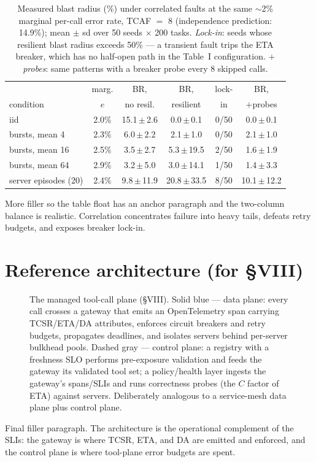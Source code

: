\documentclass[conference]{IEEEtran}
\begin{document}
\begin{table}[!t]
\caption{Measured blast radius (\%) under correlated faults at the same
$\sim$2\% marginal per-call error rate, TCAF $=$ 8 (independence prediction:
14.9\%); mean $\pm$ sd over 50 seeds $\times$ 200 tasks. \emph{Lock-in}: seeds
whose resilient blast radius exceeds 50\% --- a transient fault trips the ETA
breaker, which has no half-open path in the Table~I configuration.
\emph{$+$probes}: same patterns with a breaker probe every 8 skipped calls.}
\label{tab:correlated}
\centering
\scriptsize
\setlength{\tabcolsep}{2.8pt}
\begin{tabular}{lccccc}
\hline
 & marg. & BR, & BR, & lock- & BR,\\
condition & $e$ & no resil. & resilient & in & $+$probes\\
\hline
iid & 2.0\% & 15.1\,$\pm$\,2.6 & 0.0\,$\pm$\,0.1 & 0/50 & 0.0\,$\pm$\,0.1\\
bursts, mean 4 & 2.3\% & 6.0\,$\pm$\,2.2 & 2.1\,$\pm$\,1.0 & 0/50 & 2.1\,$\pm$\,1.0\\
bursts, mean 16 & 2.5\% & 3.5\,$\pm$\,2.7 & 5.3\,$\pm$\,19.5 & 2/50 & 1.6\,$\pm$\,1.9\\
bursts, mean 64 & 2.9\% & 3.2\,$\pm$\,5.0 & 3.0\,$\pm$\,14.1 & 1/50 & 1.4\,$\pm$\,3.3\\
server episodes (20) & 2.4\% & 9.8\,$\pm$\,11.9 & 20.8\,$\pm$\,33.5 & 8/50 & 10.1\,$\pm$\,12.2\\
\hline
\end{tabular}
\end{table}

More filler so the table float has an anchor paragraph and the two-column
balance is realistic. Correlation concentrates failure into heavy tails,
defeats retry budgets, and exposes breaker lock-in.

\section{Reference architecture (for \S VIII)}

\begin{figure}[!t]
\centering
\resizebox{\columnwidth}{!}{}
\caption{The managed tool-call plane (\S VIII). Solid blue --- data plane:
every call crosses a gateway that emits an OpenTelemetry span carrying
TCSR/ETA/DA attributes, enforces circuit breakers and retry budgets,
propagates deadlines, and isolates servers behind per-server bulkhead pools.
Dashed gray --- control plane: a registry with a freshness SLO performs
pre-exposure validation and feeds the gateway its validated tool set; a
policy/health layer ingests the gateway's spans/SLIs and runs correctness
probes (the $C$ factor of ETA) against servers. Deliberately analogous to a
service-mesh data plane plus control plane.}
\label{fig:arch}
\end{figure}

Final filler paragraph. The architecture is the operational complement of the
SLIs: the gateway is where TCSR, ETA, and DA are emitted and enforced, and the
control plane is where tool-plane error budgets are spent.
\end{document}
